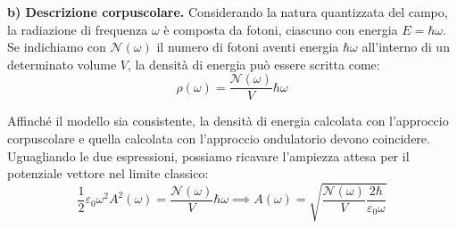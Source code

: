 \textbf{b) Descrizione corpuscolare.} Considerando la natura quantizzata del campo, la radiazione di frequenza \( \omega \) è composta da fotoni, ciascuno con energia \( E = \hbar\omega \). Se indichiamo con \( \mathcal{N}(\omega) \) il numero di fotoni aventi energia \( \hbar\omega \) all'interno di un determinato volume \( V \), la densità di energia può essere scritta come:
\begin{equation}
    \rho(\omega) = \frac{\mathcal{N}(\omega)}{V} \hbar\omega
\end{equation}

Affinché il modello sia consistente, la densità di energia calcolata con l'approccio corpuscolare e quella calcolata con l'approccio ondulatorio devono coincidere. Uguagliando le due espressioni, possiamo ricavare l'ampiezza attesa per il potenziale vettore nel limite classico:
\begin{equation}
    \frac{1}{2} \varepsilon_0 \omega^2 A^2(\omega) = \frac{\mathcal{N}(\omega)}{V} \hbar\omega \implies A(\omega) = \sqrt{\frac{\mathcal{N}(\omega)}{V} \frac{2\hbar}{\varepsilon_0 \omega}}
\end{equation}

